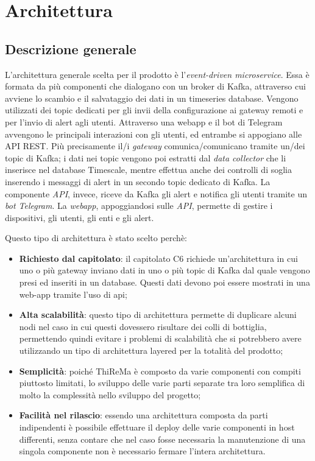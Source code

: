\section{Architettura} 
	\subsection{Descrizione generale}
		L'architettura generale scelta per il prodotto è l'\textit{event-driven microservice}. 
		Essa è formata da più componenti che dialogano con un broker di Kafka, attraverso cui avviene lo scambio e il salvataggio dei dati in un timeseries database. Vengono utilizzati dei topic dedicati per gli invii della configurazione ai gateway remoti e per l'invio di alert agli utenti. 
		Attraverso una webapp e il bot di Telegram avvengono le principali interazioni con gli utenti, ed entrambe si appogiano alle API REST.
		Più precisamente il/i \textit{gateway} comunica/comunicano tramite un/dei topic di Kafka; i dati nei topic vengono poi estratti dal \textit{data collector} che li inserisce nel database Timescale, mentre effettua anche dei controlli di soglia inserendo i messaggi di alert in un secondo topic dedicato di Kafka. La componente \textit{API}, invece, riceve da Kafka gli alert e notifica gli utenti tramite un \textit{bot Telegram}. La \textit{webapp}, appoggiandosi sulle \textit{API}, permette di gestire i dispositivi, gli utenti, gli enti e gli alert.

		Questo tipo di architettura è stato scelto perchè:
		\begin{itemize}
		 	\item \textbf{Richiesto dal capitolato}: il capitolato C6 richiede un'architettura in cui uno o più gateway inviano dati in uno o più topic di Kafka dal quale vengono presi ed inseriti in un database. Questi dati devono poi essere mostrati in una web-app tramite l'uso di api;
		 	\item \textbf{Alta scalabilità}: questo tipo di architettura permette di duplicare alcuni nodi nel caso in cui questi dovessero risultare dei colli di bottiglia, permettendo quindi evitare i problemi di scalabilità che si potrebbero avere utilizzando un tipo di architettura layered per la totalità del prodotto;
		 	\item \textbf{Semplicità}: poiché ThiReMa è composto da varie componenti con compiti piuttosto limitati, lo sviluppo delle varie parti separate tra loro semplifica di molto la complessità nello sviluppo del progetto;
		 	\item \textbf{Facilità nel rilascio}: essendo una architettura composta da parti indipendenti è possibile effettuare il deploy delle varie componenti in host differenti, senza contare che nel caso fosse necessaria la manutenzione di una singola componente non è necessario fermare l'intera architettura.
		\end{itemize}

